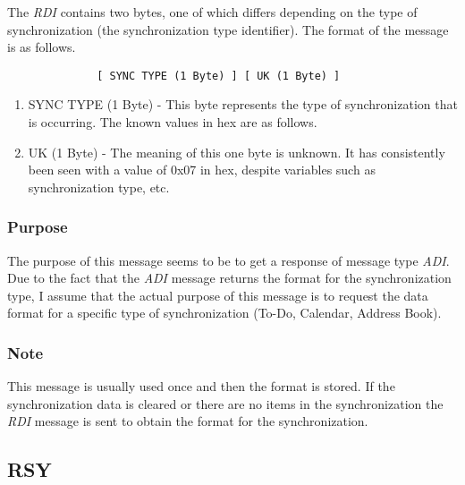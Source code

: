             The \emph{RDI} contains two bytes, one of which differs depending
            on the type of synchronization (the synchronization type
            identifier). The format of the message is as follows.

            \begin{verbatim}
              [ SYNC TYPE (1 Byte) ] [ UK (1 Byte) ]
            \end{verbatim}

            \begin{enumerate}
            \item SYNC TYPE (1 Byte) - This byte represents the type of
              synchronization that is occurring. The known values in hex are
              as follows.

              \synctypes

            \item UK (1 Byte) - The meaning of this one byte is unknown. It
              has consistently been seen with a value of 0x07 in hex, despite
              variables such as synchronization type, etc.
            \end{enumerate}
            
            \subsubsection{Purpose}

            The purpose of this message seems to be to get a response of
            message type \emph{ADI}. Due to the fact that the \emph{ADI}
            message returns the format for the synchronization type, I assume
            that the actual purpose of this message is to request the data
            format for a specific type of synchronization (To-Do, Calendar,
            Address Book).

            \subsubsection{Note}

            This message is usually used once and then the format is stored. If
            the synchronization data is cleared or there are no items in the
            synchronization the \emph{RDI} message is sent to obtain the
            format for the synchronization.

        \subsection{RSY}

